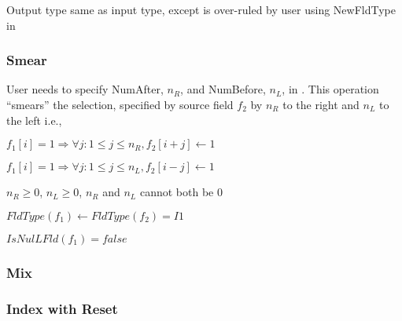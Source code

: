 Output type same as  input type, except is over-ruled by user using
NewFldType in \Args

\subsubsection{Smear}
\label{f1opf2_smear}

User needs to specify NumAfter, \(n_R\), and NumBefore, \(n_L\), in \Args.
This operation ``smears'' the selection, specified by source field \(f_2\) by \(n_R\) to the right and
\(n_L\) to the left i.e., 
\bi
\item 
\(f_1[i] = 1 \Rightarrow \forall j: 1 \leq j \leq n_R, f_2[i+j] \leftarrow 1\)
 \item 
\(f_1[i] = 1 \Rightarrow \forall j: 1 \leq j \leq n_L, f_2[i-j] \leftarrow 1\) 
\item \(n_R \geq 0\), \(n_L \geq 0\), \(n_R\) and \(n_L\) cannot both be
0
\item \(FldType(f_1) \leftarrow FldType(f_2) = I1\)
\item \(IsNulLFld(f_1) = false\)
\ei


\subsubsection{Mix}
\label{f1opf2_mix}

\TBC

\subsubsection{Index with Reset}
\label{f1opf2_idx_with_reset}

\TBC


